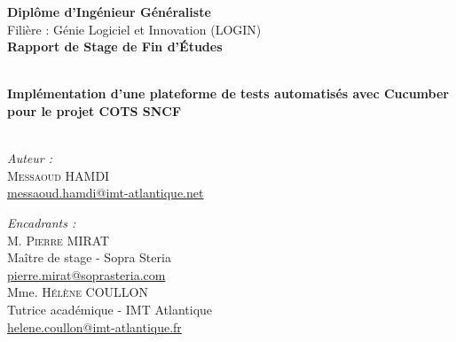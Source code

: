 \begin{titlepage}
\vspace{10mm}

\begin{center}
{\large \bfseries Diplôme d'Ingénieur Généraliste}\\[0.5cm]
{\large Filière : Génie Logiciel et Innovation (LOGIN)}\\[0.8cm]
{\huge \bfseries Rapport de Stage de Fin d'Études}\\
\end{center}

\vspace{5mm}

\HRule \\[0.4cm]
{ \huge \bfseries Implémentation d'une plateforme de tests automatisés avec Cucumber pour le projet COTS SNCF\\[0.4cm] }
\HRule \\[1cm]

\vspace{5mm}

\noindent
\begin{minipage}{0.5\textwidth}
  \begin{flushleft} \large
    \emph{Auteur :}\\
    \vskip 0.1cm
    \textsc{Messaoud HAMDI}\\
    \small{\href{mailto:messaoud.hamdi@imt-atlantique.net}{messaoud.hamdi@imt-atlantique.net}}\\[0.5cm]
  \end{flushleft}
\end{minipage}
\begin{minipage}{0.4\textwidth}
  \begin{flushright} \large
    \begin{flushleft}
    \emph{Encadrants :} \\
    \vskip 0.1cm
    M. \textsc{Pierre MIRAT}\\
    \small{Maître de stage - Sopra Steria}\\
    \small{\href{mailto:pierre.mirat@soprasteria.com}{pierre.mirat@soprasteria.com}}\\[0.3cm]
    
    Mme. \textsc{Hélène COULLON}\\
    \small{Tutrice académique - IMT Atlantique}\\
    \small{\href{mailto:helene.coullon@imt-atlantique.fr}{helene.coullon@imt-atlantique.fr}}\\[0.5cm]
    \end{flushleft}
  \end{flushright}
\end{minipage}\\[1cm]


\end{titlepage}
